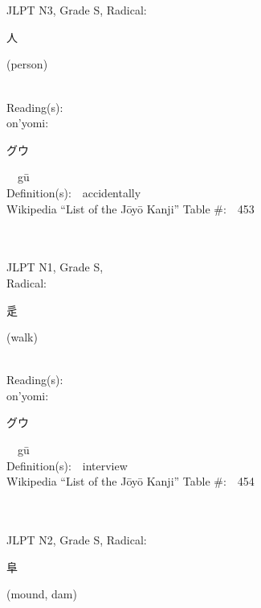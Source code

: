 \begin{multicols}{2}
\ \ \\
{\fontsize{34pt}{40pt}  }\ \ \\  %
{JLPT N3, Grade S, Radical:\ \ {\begin{CJK}{UTF8}{min} 人 \end{CJK}} (person) } \\
Reading(s):\ \ \\
{\hspace*{1em}}on'yomi:\ \ \\
{\hspace*{2em}}{\begin{CJK}{UTF8}{min} グウ \end{CJK}}\ \ g\=u\ \ \\
Definition(s):\ \ accidentally \\
Wikipedia ``List of the J\=oy\=o Kanji'' Table \#:\ \ 453 \\
\ \ \\
{\fontsize{34pt}{40pt}  }\ \ \\
{JLPT N1, Grade S, \\Radical:\ \ {\begin{CJK}{UTF8}{min} 辵 \end{CJK}} (walk) } \\
Reading(s):\ \ \\
{\hspace*{1em}}on'yomi:\ \ \\
{\hspace*{2em}}{\begin{CJK}{UTF8}{min} グウ \end{CJK}}\ \ g\=u\ \ \\
Definition(s):\ \ interview \\
Wikipedia ``List of the J\=oy\=o Kanji'' Table \#:\ \ 454 \\
\ \ \\
{\fontsize{34pt}{40pt}  }\ \ \\  %
{JLPT N2, Grade S, Radical:\ \ {\begin{CJK}{UTF8}{min} 阜 \end{CJK}} (mound, dam) } \\

\end{multicols}
